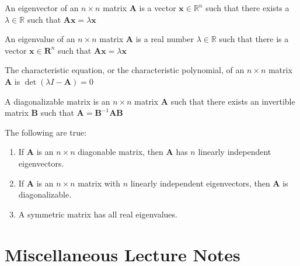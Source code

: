     \begin{definition}
        An eigenvector of an ${n}\times{n}$ matrix
        $\mathbf{A}$ is a vector
        $\mathbf{x}\in\mathbb{R}^{n}$
        such that there exists a $\lambda\in\mathbb{R}$
        such that
        $\mathbf{A}\mathbf{x}=\lambda\mathbf{x}$
    \end{definition}
    \begin{definition}
        An eigenvalue of an ${n}\times{n}$ matrix
        $\mathbf{A}$ is a real number
        $\lambda\in\mathbb{R}$ such that there is
        a vector $\mathbf{x}\in\mathbf{R}^{n}$ such
        that $\mathbf{A}\mathbf{x}=\lambda\mathbf{x}$
    \end{definition}
    \begin{definition}
        The characteristic equation, or
        the characteristic polynomial, of an
        ${n}\times{n}$ matrix $\mathbf{A}$
        is $\det(\lambda{I}-\mathbf{A})=0$
    \end{definition}
    \begin{definition}
        A diagonalizable matrix is an
        ${n}\times{n}$ matrix
        $\mathbf{A}$ such that there exists
        an invertible matrix $\mathbf{B}$
        such that
        $\mathbf{A}=\mathbf{B}^{-1}\mathbf{A}\mathbf{B}$
    \end{definition}
    \begin{theorem}
        The following are true:
        \begin{enumerate}
            \item If $\mathbf{A}$ is an ${n}\times{n}$
                diagonable matrix, then $\mathbf{A}$
                has $n$ linearly independent
                eigenvectors.
            \item If $\mathbf{A}$ is an ${n}\times{n}$
                matrix with $n$ linearly independent
                eigenvectors, then $\mathbf{A}$
                is diagonalizable.
            \item A symmetric matrix has all real
                eigenvalues.
        \end{enumerate}
    \end{theorem}
\section{Miscellaneous Lecture Notes}
